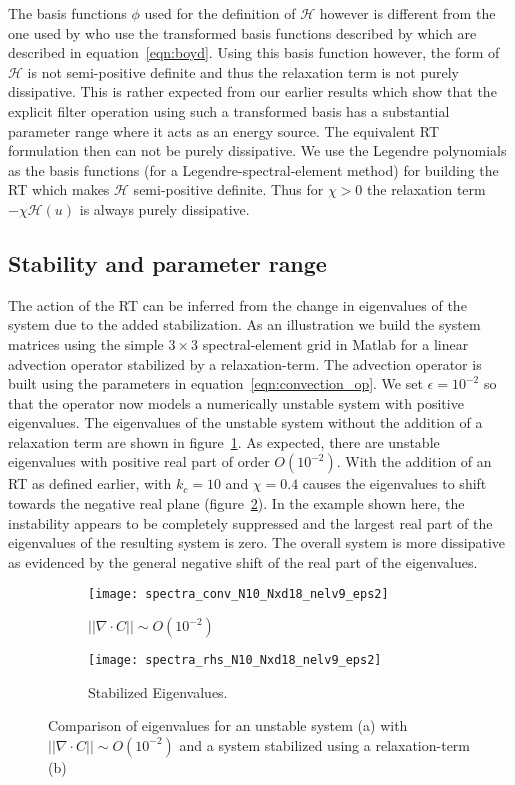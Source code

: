 The basis functions $\phi$ used for the definition of $\mathcal{H}$ however is different from the one used by \cite{malm13} who use the transformed basis functions described by \cite{boyd98} which are described in equation~\ref{eqn:boyd}. Using this basis function however, the form of $\mathcal{H}$ is not semi-positive definite and thus the relaxation term is not purely dissipative. This is rather expected from our earlier results which show that the explicit filter operation using such a transformed basis has a substantial parameter range where it acts as an energy source. The equivalent RT formulation then can not be purely dissipative. We use the Legendre polynomials as the basis functions (for a Legendre-spectral-element method) for building the RT which makes $\mathcal{H}$ semi-positive definite. Thus for $\chi>0$ the relaxation term $-\chi\mathcal{H}(u)$ is always purely dissipative.

\subsection{Stability and parameter range}
The action of the RT can be inferred from the change in eigenvalues of the system due to the added stabilization. As an illustration we build the system matrices using the simple $3\times3$ spectral-element grid in Matlab for a linear advection operator stabilized by a relaxation-term. The advection operator is built using the parameters in equation~\ref{eqn:convection_op}. We set $\epsilon=10^{-2}$ so that the operator now models a numerically unstable system with positive eigenvalues. The eigenvalues of the unstable system without the addition of a relaxation term are shown in figure~\ref{fig:spectra_conv_eps2}. As expected, there are unstable eigenvalues with positive real part of order $O(10^{-2})$. With the addition of an RT as defined earlier, with $k_{c}=10$ and $\chi=0.4$ causes the eigenvalues to shift towards the negative real plane (figure~\ref{fig:spectra_rhs_eps2}). In the example shown here, the instability appears to be completely suppressed and the largest real part of the eigenvalues of the resulting system is zero. The overall system is more dissipative as evidenced by the general negative shift of the real part of the eigenvalues.
\begin{figure}[h]
	\centering
	\begin{subfigure}[b]{0.45\textwidth}
		\centering
		\texttt{[image: spectra\_conv\_N10\_Nxd18\_nelv9\_eps2]}
		\caption{$||\nabla\cdot C|| \sim O(10^{-2})$}
		\label{fig:spectra_conv_eps2}
	\end{subfigure}
	\begin{subfigure}[b]{0.45\textwidth}
		\centering
		\texttt{[image: spectra\_rhs\_N10\_Nxd18\_nelv9\_eps2]}
		\caption{Stabilized Eigenvalues.}
		\label{fig:spectra_rhs_eps2}
	\end{subfigure}
	\caption{Comparison of eigenvalues for an unstable system (a) with $||\nabla\cdot C|| \sim O(10^{-2})$ and a system stabilized using a relaxation-term (b)}
	\label{fig:rt_spectra}
\end{figure}

